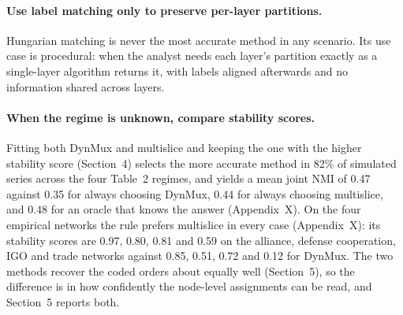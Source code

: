 \paragraph{Use label matching only to preserve per-layer partitions.}
Hungarian matching is never the most accurate method in any scenario. Its
use case is procedural: when the analyst needs each layer's partition exactly
as a single-layer algorithm returns it, with labels aligned afterwards and no
information shared across layers.

\paragraph{When the regime is unknown, compare stability scores.}
Fitting both DynMux and multislice and keeping the one with the higher
stability score (Section~4) selects the more accurate method in 82\% of
simulated series across the four Table~2 regimes, and yields a mean joint
NMI of 0.47 against 0.35 for always choosing DynMux, 0.44 for always
choosing multislice, and 0.48 for an oracle that knows the answer
(Appendix~X). On the four empirical networks the rule prefers multislice in
every case (Appendix~X): its stability scores are 0.97, 0.80, 0.81 and 0.59
on the alliance, defense cooperation, IGO and trade networks against 0.85,
0.51, 0.72 and 0.12 for DynMux. The two methods recover the coded orders
about equally well (Section~5), so the difference is in how confidently the
node-level assignments can be read, and Section~5 reports both.

